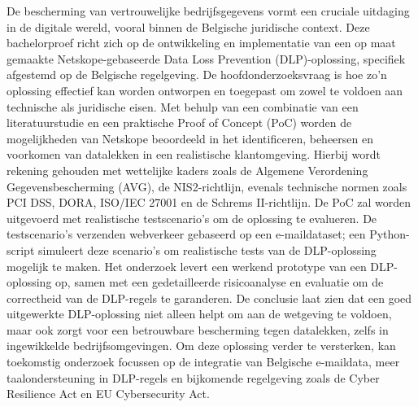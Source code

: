 De bescherming van vertrouwelijke bedrijfsgegevens vormt een cruciale uitdaging in de digitale wereld, 
vooral binnen de Belgische juridische context. 
Deze bachelorproef richt zich op de ontwikkeling en implementatie van een op maat gemaakte Netskope-gebaseerde Data Loss Prevention (DLP)-oplossing, 
specifiek afgestemd op de Belgische regelgeving. 
De hoofdonderzoeksvraag is hoe zo'n oplossing effectief kan worden ontworpen en toegepast om zowel te voldoen aan technische als juridische eisen. 
Met behulp van een combinatie van een literatuurstudie en een praktische Proof of Concept (PoC) worden de mogelijkheden van Netskope beoordeeld in het identificeren, 
beheersen en voorkomen van datalekken in een realistische klantomgeving. Hierbij wordt rekening gehouden met wettelijke kaders zoals de 
Algemene Verordening Gegevensbescherming (AVG), de NIS2-richtlijn, evenals technische normen zoals PCI DSS, DORA, ISO/IEC 27001 en de Schrems II-richtlijn. 
De PoC zal worden uitgevoerd met realistische testscenario's om de oplossing te evalueren. 
De testscenario’s verzenden webverkeer gebaseerd op een e-maildataset; een Python-script simuleert deze scenario's om realistische tests van de DLP\--oploss\-ing mogelijk te maken. 
Het onderzoek levert een werkend prototype van een DLP-oplossing op, samen met een gedetailleerde risicoanalyse en evaluatie om de correctheid van de DLP-regels te garanderen.
De conclusie laat zien dat een goed uitgewerkte DLP-oplossing niet alleen helpt
om aan de wetgeving te voldoen, maar ook zorgt voor een betrouwbare bescherming tegen datalekken, zelfs in ingewikkelde bedrijfsomgevingen.
Om deze oplossing verder te versterken, kan toekomstig onderzoek focussen op de integratie van Belgische e-maildata,
meer taalondersteuning in DLP-regels en bijkomende regelgeving zoals de Cyber Resilience Act en EU Cybersecurity Act.


